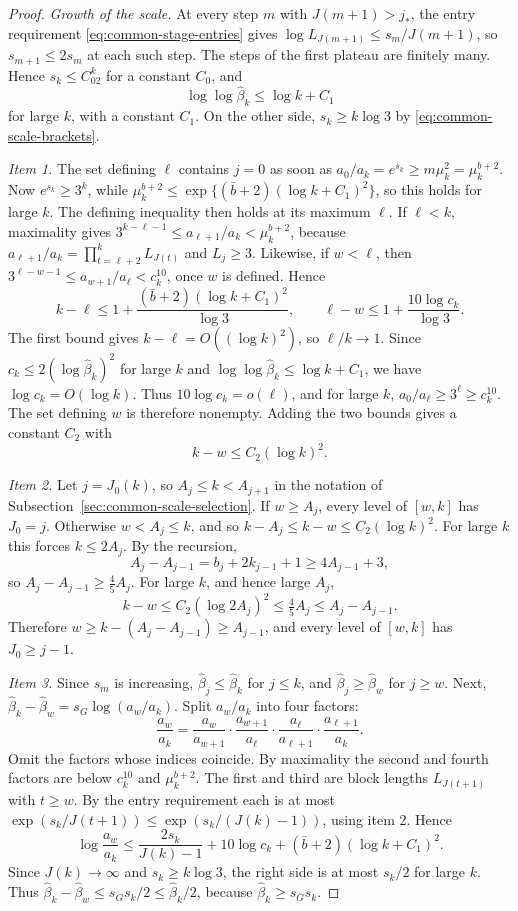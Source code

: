 \begin{proof}
\emph{Growth of the scale.} At every step $m$ with $J(m+1)>j_*$, the
entry requirement \eqref{eq:common-stage-entries} gives
$\log L_{J(m+1)}\le s_m/J(m+1)$, so $s_{m+1}\le2s_m$ at each such step.
The steps of the first plateau are finitely many. Hence $s_k\le C_02^k$ for a constant $C_0$, and
\[
 \log\log\widehat\beta_k\le\log k+C_1
\]
for large $k$, with a constant $C_1$. On the other side,
$s_k\ge k\log3$ by \eqref{eq:common-scale-brackets}.

\emph{Item 1.} The set defining $\ell$ contains $j=0$ as soon as
$a_0/a_k=e^{s_k}\ge m\mu_k^2=\mu_k^{b+2}$. Now
$e^{s_k}\ge3^k$, while
$\mu_k^{b+2}\le\exp\{(\bar b+2)(\log k+C_1)^2\}$, so this holds for large
$k$. The defining inequality then holds at its maximum $\ell$. If $\ell<k$, maximality gives
$3^{k-\ell-1}\le a_{\ell+1}/a_k<\mu_k^{b+2}$, because
$a_{\ell+1}/a_k=\prod_{t=\ell+2}^kL_{J(t)}$ and $L_j\ge3$. Likewise, if
$w<\ell$, then $3^{\ell-w-1}\le a_{w+1}/a_\ell<c_k^{10}$, once $w$ is
defined. Hence
\[
 k-\ell\le1+\frac{(\bar b+2)(\log k+C_1)^2}{\log3},\qquad
 \ell-w\le1+\frac{10\log c_k}{\log3}.
\]
The first bound gives $k-\ell=O((\log k)^2)$, so $\ell/k\to1$.
Since $c_k\le2(\log\widehat\beta_k)^2$ for large $k$ and
$\log\log\widehat\beta_k\le\log k+C_1$, we have
$\log c_k=O(\log k)$. Thus $10\log c_k=o(\ell)$, and for large $k$,
$a_0/a_\ell\ge3^\ell\ge c_k^{10}$. The set defining $w$ is therefore
nonempty. Adding the two bounds gives a constant $C_2$ with
\[
 k-w\le C_2(\log k)^2 .
\]

\emph{Item 2.} Let $j=J_0(k)$, so $A_j\le k<A_{j+1}$ in the notation of
Subsection~\ref{sec:common-scale-selection}. If $w\ge A_j$, every level of
$[w,k]$ has $J_0=j$. Otherwise $w<A_j\le k$, and so
$k-A_j\le k-w\le C_2(\log k)^2$. For large $k$ this forces
$k\le2A_j$. By the recursion,
\[
 A_j-A_{j-1}=b_j+2k_{j-1}+1\ge4A_{j-1}+3 ,
\]
so $A_j-A_{j-1}\ge\tfrac45A_j$. For large $k$, and hence large $A_j$,
\[
 k-w\le C_2(\log2A_j)^2\le\tfrac45A_j\le A_j-A_{j-1}.
\]
Therefore $w\ge k-(A_j-A_{j-1})\ge A_{j-1}$, and every level of $[w,k]$
has $J_0\ge j-1$.

\emph{Item 3.} Since $s_m$ is increasing, $\widehat\beta_j\le\widehat\beta_k$
for $j\le k$, and $\widehat\beta_j\ge\widehat\beta_w$ for $j\ge w$. Next,
$\widehat\beta_k-\widehat\beta_w=s_G\log(a_w/a_k)$. Split $a_w/a_k$ into
four factors:
\[
 \frac{a_w}{a_k}
 =\frac{a_w}{a_{w+1}}\cdot\frac{a_{w+1}}{a_\ell}\cdot
  \frac{a_\ell}{a_{\ell+1}}\cdot\frac{a_{\ell+1}}{a_k}.
\]
Omit the factors whose indices coincide. By maximality the second and
fourth factors are below $c_k^{10}$ and $\mu_k^{b+2}$. The first and third
are block lengths $L_{J(t+1)}$ with $t\ge w$. By the entry requirement
each is at most $\exp(s_k/J(t+1))\le\exp(s_k/(J(k)-1))$, using item 2.
Hence
\[
 \log\frac{a_w}{a_k}\le\frac{2s_k}{J(k)-1}+10\log c_k
   +(\bar b+2)(\log k+C_1)^2 .
\]
Since $J(k)\to\infty$ and $s_k\ge k\log3$, the right side is at most
$s_k/2$ for large $k$. Thus
$\widehat\beta_k-\widehat\beta_w\le s_Gs_k/2\le\widehat\beta_k/2$,
because $\widehat\beta_k\ge s_Gs_k$.
\end{proof}

